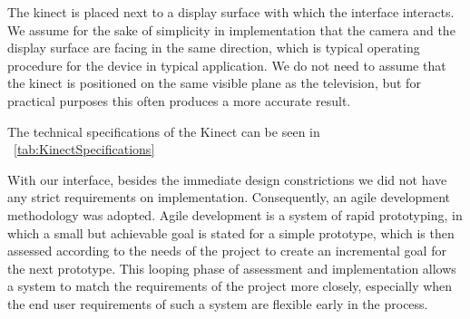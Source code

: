 
The kinect is placed next to a display surface with which the interface interacts. We assume for the sake of simplicity in implementation that the camera and the display surface are facing in the same direction, which is typical operating procedure for the device in typical application. We do not need to assume that the kinect is positioned on the same visible plane as the television, but for practical purposes this often produces a more accurate result. 

The technical specifications of the Kinect can be seen in ~\ref{tab:KinectSpecifications}

With our interface, besides the immediate design constrictions  we did not have any strict requirements on implementation. Consequently, an agile development  methodology was adopted. Agile development is a system of rapid prototyping, in which a small but achievable goal is stated for a simple prototype, which is then assessed according to the needs of the project to create an incremental goal for the next prototype. This looping phase of assessment and implementation allows a system to match the requirements of the project more closely, especially when the end user requirements of such a system are flexible early in the process.

